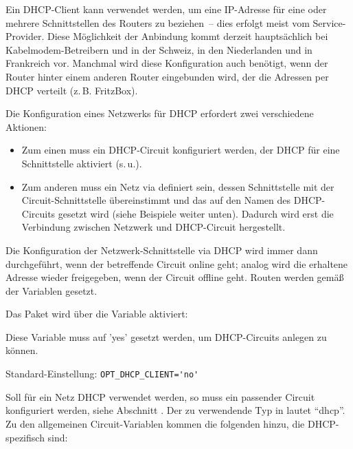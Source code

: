 
Ein DHCP-Client kann verwendet werden, um eine IP-Adresse für eine oder
mehrere Schnittstellen des Routers zu beziehen~-- dies erfolgt meist vom
Service-Provider. Diese Möglichkeit der Anbindung kommt derzeit
hauptsächlich bei Kabelmodem-Betreibern und in der Schweiz, in den
Niederlanden und in Frankreich vor. Manchmal wird diese Konfiguration
auch benötigt, wenn der Router hinter einem anderen Router eingebunden
wird, der die Adressen per DHCP verteilt (z.\,B. FritzBox).

Die Konfiguration eines Netzwerks für DHCP erfordert zwei verschiedene
Aktionen:
\begin{itemize}
\item Zum einen muss ein DHCP-Circuit konfiguriert werden, der DHCP für eine
Schnittstelle aktiviert (s.\,u.).
\item Zum anderen muss ein Netz via  definiert sein, dessen
Schnittstelle mit der Circuit-Schnittstelle übereinstimmt und das auf den
Namen des DHCP-Circuits gesetzt wird (siehe Beispiele weiter unten). Dadurch
wird erst die Verbindung zwischen Netzwerk und DHCP-Circuit hergestellt.
\end{itemize}

Die Konfiguration der Netzwerk-Schnittstelle via DHCP wird immer dann
durchgeführt, wenn der betreffende Circuit online geht; analog wird die
erhaltene Adresse wieder freigegeben, wenn der Circuit offline geht. Routen
werden gemäß der Variablen  gesetzt.

Das Paket wird über die Variable  aktiviert:

\begin{description}

Diese Variable muss auf 'yes' gesetzt werden, um DHCP-Circuits anlegen zu
können.

Standard-Einstellung: \verb+OPT_DHCP_CLIENT='no'+
\end{description}

Soll für ein Netz DHCP verwendet werden, so muss ein passender Circuit
konfiguriert werden, siehe Abschnitt .
Der zu verwendende Typ in  lautet ``dhcp''. Zu den
allgemeinen Circuit-Variablen kommen die folgenden hinzu, die DHCP-spezifisch
sind:

